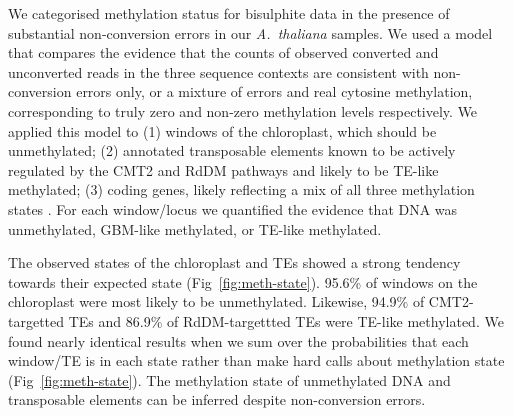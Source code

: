 \documentclass[10pt,draft,letterpaper]{article}
\begin{document}
We categorised methylation status for bisulphite data in the presence of substantial non-conversion errors in our \emph{A.~thaliana} samples.
We used a model that compares the evidence that the counts of observed converted and unconverted reads in the three sequence contexts are consistent with non-conversion errors only, or a mixture of errors and real cytosine methylation, corresponding to truly zero and non-zero methylation levels respectively.
We applied this model to (1) windows of the chloroplast, which should be unmethylated; (2) annotated transposable elements known to be actively regulated by the CMT2 and RdDM pathways \cite{stroud2013comprehensive} and likely to be TE-like methylated; (3) coding genes, likely reflecting a mix of all three methylation states \cite{zhang2020natural}.
For each window/locus we quantified the evidence that DNA was unmethylated, GBM-like methylated, or TE-like methylated.

The observed states of the chloroplast and TEs showed a strong tendency towards their expected state (Fig~\ref{fig:meth-state}).
95.6\% of windows on the chloroplast were most likely to be unmethylated.
Likewise, 94.9\% of CMT2-targetted TEs and 86.9\% of RdDM-targettted TEs were TE-like methylated.
We found nearly identical results when we sum over the probabilities that each window/TE is in each state rather than make hard calls about methylation state (Fig~\ref{fig:meth-state}).
The methylation state of unmethylated DNA and transposable elements can be inferred despite non-conversion errors.

\begin{figure*}
    \centering
    \caption{
        {\bf Methylation state calls in windows of the chloroplast, genes, CMT-targetted TEs and RdDM-targetted TEs.}
        Plots show the posterior probabilities that a single window/gene/TE is in each state.
        Only those features with at least one aligned read in each sequence context are shown.
    }
    \label{fig:meth-state}
\end{figure*}
\end{document}
